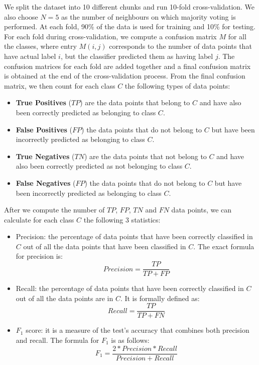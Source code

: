 We split the dataset into 10 different chunks and run 10-fold cross-validation. We also choose $N = 5$ as the number of neighbours on which majority voting is performed. At each fold, 90\% of the data is used for training and 10\% for testing. For each fold during cross-validation, we compute a confusion matrix $M$ for all the classes, where entry $M(i,j)$ corresponds to the number of data points that have actual label $i$, but the classifier predicted them as having label $j$. The confusion matrices for each fold are added together and a final confusion matrix is obtained at the end of the cross-validation process. From the final confusion matrix, we then count for each class $C$ the following types of data points:
 \begin{itemize}
  \item \textbf{True Positives} ($TP$) are the data points that belong to $C$ and have also been correctly predicted as belonging to class $C$.
  \item \textbf{False Positives} ($FP$) the data points that do not belong to $C$ but have been incorrectly predicted as belonging to class $C$.
  \item \textbf{True Negatives} ($TN$) are the data points that not belong to $C$ and have also been correctly predicted as not belonging to class $C$.
  \item \textbf{False Negatives} ($FP$) the data points that do not belong to $C$ but have been incorrectly predicted as belonging to class $C$.
 \end{itemize}

After we compute the number of $TP$, $FP$, $TN$ and $FN$ data points, we can calculate for each class $C$ the following 3 statistics:
\begin{itemize}
 \item Precision: the percentage of data points that have been correctly classified in $C$ out of all the data points that have been classified in $C$. The exact formula for precision is:
 $$ Precision = \frac{TP}{TP + FP}$$
  \item Recall: the percentage of data points that have been correctly classified in $C$ out of all the data points are in $C$. It is formally defined as:
 $$ Recall = \frac{TP}{TP + FN}$$
  \item $F_1$ score: it is a measure of the test's accuracy that combines both precision and recall. The formula for $F_1$ is as follows:
 $$ F_1 = \frac{2 * Precision * Recall}{Precision + Recall}$$
 
\end{itemize}

